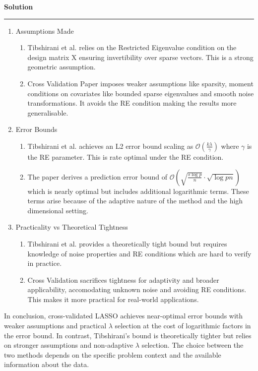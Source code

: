 \documentclass[a4paper,12pt]{article}
\newenvironment{solution}[2][]{%
    \begin{mdframed}[linecolor=blue!70!black, linewidth=2pt, roundcorner=10pt, backgroundcolor=yellow!10!white, skipabove=12pt, skipbelow=12pt]%
        \textbf{\large #2}
        \par\noindent\rule{\textwidth}{0.4pt}
}{
    \end{mdframed}
}
\begin{document}
\begin{solution}{Solution}
\begin{enumerate}
    \item Assumptions Made 
    \begin{enumerate}
      \item Tibshirani et al. relies on the Restricted Eigenvalue condition on the design matrix X ensuring invertibility over sparse vectors. This is a strong geometric assumption.
      \item Cross Validation Paper imposes weaker assumptions like sparsity, moment conditions on covariates like bounded sparse eigenvalues and smooth noise transformations. It avoids the RE condition making the results more generalisable.
    \end{enumerate}
  
  \item Error Bounds
  \begin{enumerate}
    \item Tibshirani et al. achieves an L2 error bound scaling as $\mathcal{O}\left(\displaystyle\frac{k\lambda}{\gamma}\right)$ where $\gamma$ is the RE parameter. This is rate optimal under the RE condition.
    \item The paper derives a prediction error bound of $\mathcal{O}\left(\sqrt{\displaystyle\frac{s\log{p}}{n}}\cdot \sqrt{\log{pn}}\right)$ which is nearly optimal but includes additional logarithmic terms. These terms arise because of the adaptive nature of the method and the high dimensional setting.
  \end{enumerate}

  \item Practicality vs Theoretical Tightness
  \begin{enumerate}
    \item Tibshirani et al. provides a theoretically tight bound but requires knowledge of noise properties and RE conditions which are hard to verify in practice.
    \item Cross Validation sacrifices tightness for adaptivity and broader applicability, accomodating unknown noise and avoiding RE conditions. This makes it more practical for real-world applications.
  \end{enumerate}
  \end{enumerate}

\noindent In conclusion, cross-validated LASSO achieves near-optimal error bounds with weaker assumptions and practical $\lambda$ selection at the cost of logarithmic factors in the error bound. In contrast, Tibshirani's bound is theoretically tighter but relies on stronger assumptions and non-adaptive $\lambda$ selection. The choice between the two methods depends on the specific problem context and the available information about the data.

\end{solution}
\end{document}
